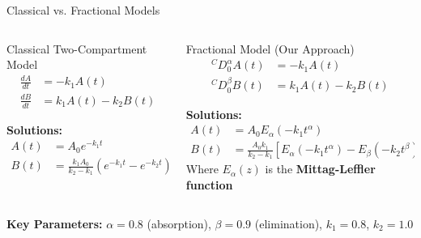 \documentclass[aspectratio=169,14pt]{beamer}
\newcommand{\highlight}[1]{\textcolor{kentech_orange}{\textbf{#1}}}
\begin{document}
\begin{frame}{Classical vs. Fractional Models}
    \begin{columns}
        \begin{column}{0.5\textwidth}
            \begin{block}{Classical Two-Compartment Model}
                \begin{align}
                    \frac{dA}{dt} &= -k_1 A(t) \\
                    \frac{dB}{dt} &= k_1 A(t) - k_2 B(t)
                \end{align}
                
                \textbf{Solutions:}
                \begin{align}
                    A(t) &= A_0 e^{-k_1 t} \\
                    B(t) &= \frac{k_1 A_0}{k_2-k_1}(e^{-k_1 t} - e^{-k_2 t})
                \end{align}
            \end{block}
        \end{column}
        
        \begin{column}{0.5\textwidth}
            \begin{block}{Fractional Model (Our Approach)}
                \begin{align}
                    {}^C D_0^\alpha A(t) &= -k_1 A(t) \\
                    {}^C D_0^\beta B(t) &= k_1 A(t) - k_2 B(t)
                \end{align}
                
                \textbf{Solutions:}
                \begin{align}
                    A(t) &= A_0 E_\alpha(-k_1 t^\alpha) \\
                    B(t) &= \frac{A_0 k_1}{k_2-k_1}[E_\alpha(-k_1 t^\alpha) - E_\beta(-k_2 t^\beta)]
                \end{align}
                  Where $E_\alpha(z)$ is the \highlight{Mittag-Leffler function}
            \end{block}
        \end{column}
    \end{columns}
    
    \vspace{0.3cm}
    \begin{center}
        \highlight{Key Parameters:} $\alpha = 0.8$ (absorption), $\beta = 0.9$ (elimination), $k_1 = 0.8$, $k_2 = 1.0$
    \end{center}
\end{frame}
\end{document}
